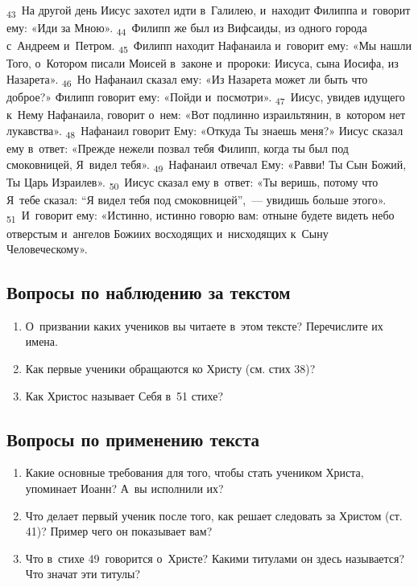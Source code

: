\documentclass[a4paper,12pt]{article}
\begin{document}
\textsubscript{43}~На другой день Иисус захотел идти в~Галилею, и~находит Филиппа и~говорит ему: «Иди за Мною». \textsubscript{44}~Филипп же был из Вифсаиды, из одного города с~Андреем и~Петром. \textsubscript{45}~Филипп находит Нафанаила и~говорит ему: «Мы нашли Того, о~Котором писали Моисей в~законе и~пророки: Иисуса, сына Иосифа, из Назарета». \textsubscript{46}~Но Нафанаил сказал ему: «Из Назарета может ли быть что доброе?» Филипп говорит ему: «Пойди и~посмотри». \textsubscript{47}~Иисус, увидев идущего к~Нему Нафанаила, говорит о~нем: «Вот подлинно израильтянин, в~котором нет лукавства». \textsubscript{48}~Нафанаил говорит Ему: «Откуда Ты знаешь меня?» Иисус сказал ему в~ответ: «Прежде нежели позвал тебя Филипп, когда ты был под смоковницей, Я~видел тебя». \textsubscript{49}~Нафанаил отвечал Ему: «Равви! Ты Сын Божий, Ты Царь Израилев». \textsubscript{50}~Иисус сказал ему в~ответ: «Ты веришь, потому что Я~тебе сказал: “Я видел тебя под смоковницей”,~--- увидишь больше этого». \textsubscript{51}~И~говорит ему: «Истинно, истинно говорю вам: отныне будете видеть небо отверстым и~ангелов Божиих восходящих и~нисходящих к~Сыну Человеческому». 

\subsection*{Вопросы по наблюдению за текстом}
\begin{enumerate}
    \item О~призвании каких учеников вы читаете в~этом тексте? Перечислите их имена. 
    
    \myline
    
    \myline
    \item Как первые ученики обращаются ко Христу (см. стих 38)? 
    
    \myline
    
    \myline
    \item Как Христос называет Себя в~51 стихе?
    
    \myline
    
    \myline
\end{enumerate}

\subsection*{Вопросы по применению текста} 
\begin{enumerate}
    \item Какие основные требования для того, чтобы стать учеником Христа, упоминает Иоанн? А~вы исполнили их? 
    
    \myline
    
    \myline
    \item Что делает первый ученик после того, как решает следовать за Христом (ст. 41)? Пример чего он показывает вам? 
    
    \myline
    
    \myline
    \item Что в~стихе 49~говорится о~Христе? Какими титулами он здесь называется? Что значат эти титулы? 
    
    \myline
    
    \myline
\end{enumerate}
\end{document}
